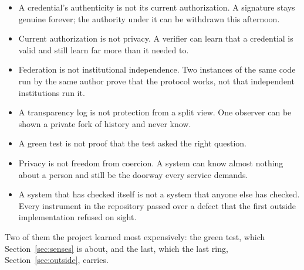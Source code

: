 \begin{itemize}
  \item A credential's authenticity is not its current authorization. A signature stays genuine
    forever; the authority under it can be withdrawn this afternoon.
  \item Current authorization is not privacy. A verifier can learn that a credential is valid and
    still learn far more than it needed to.
  \item Federation is not institutional independence. Two instances of the same code run by the
    same author prove that the protocol works, not that independent institutions run it.
  \item A transparency log is not protection from a split view. One observer can be shown a private
    fork of history and never know.
  \item A green test is not proof that the test asked the right question.
  \item Privacy is not freedom from coercion. A system can know almost nothing about a person and
    still be the doorway every service demands.
  \item A system that has checked itself is not a system that anyone else has checked. Every
    instrument in the repository passed over a defect that the first outside implementation refused
    on sight.
\end{itemize}

Two of them the project learned most expensively: the green test, which Section~\ref{sec:senses} is
about, and the last, which the last ring, Section~\ref{sec:outside}, carries.
